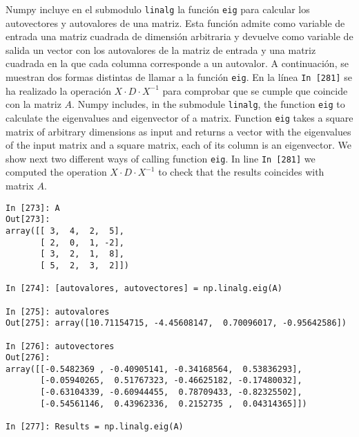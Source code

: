 \begin{paracol}{2}
Numpy incluye en el submodulo \texttt{linalg} la función \texttt{eig} para calcular los autovectores y autovalores de una matriz. Esta función admite como variable de entrada una matriz cuadrada de dimensión arbitraria y devuelve como variable de salida un vector con los autovalores de la matriz de entrada y una matriz cuadrada en la que cada columna corresponde a un autovalor. A continuación, se muestran dos formas distintas de llamar a la función \texttt{eig}. En la línea \texttt{In [281]} se ha realizado la operación $X\cdot D \cdot X^{-1}$ para comprobar que se cumple que coincide con la matriz $A$.
\switchcolumn
Numpy includes, in the submodule \texttt{linalg}, the function \texttt{eig} to calculate the eigenvalues and eigenvector of a matrix. Function \texttt{eig} takes a square matrix of arbitrary dimensions as input and returns a vector with the eigenvalues of the input matrix and a square matrix, each of its column is an eigenvector. We show next two different ways of calling function \texttt{eig}. In line \texttt{In [281]} we computed the operation $X\cdot D \cdot X^{-1}$ to check that the results coincides with matrix $A$.
\end{paracol}
\begin{center}
    \begin{minipage}{\textwidth}
    \begin{verbatim}
In [273]: A
Out[273]: 
array([[ 3,  4,  2,  5],
       [ 2,  0,  1, -2],
       [ 3,  2,  1,  8],
       [ 5,  2,  3,  2]])

In [274]: [autovalores, autovectores] = np.linalg.eig(A)

In [275]: autovalores
Out[275]: array([10.71154715, -4.45608147,  0.70096017, -0.95642586])

In [276]: autovectores
Out[276]: 
array([[-0.5482369 , -0.40905141, -0.34168564,  0.53836293],
       [-0.05940265,  0.51767323, -0.46625182, -0.17480032],
       [-0.63104339, -0.60944455,  0.78709433, -0.82325502],
       [-0.54561146,  0.43962336,  0.2152735 ,  0.04314365]])

In [277]: Results = np.linalg.eig(A)
\end{verbatim}    
\end{minipage}
\end{center}

